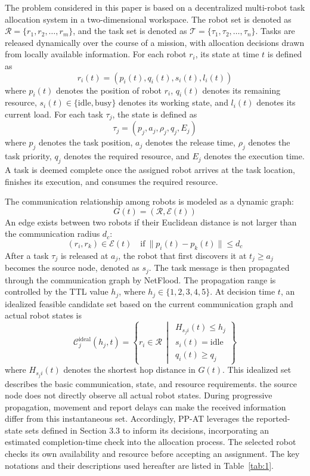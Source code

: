 \documentclass[type=submission,name=IR]{oae}
\begin{document}
The problem considered in this paper is based on a decentralized multi-robot task allocation system in a two-dimensional workspace. The robot set is denoted as $\mathcal{R}=\{r_1,r_2,\ldots,r_m\}$, and the task set is denoted as $\mathcal{T}=\{\tau_1,\tau_2,\ldots,\tau_n\}$. Tasks are released dynamically over the course of a mission, with allocation decisions drawn from locally available information. For each robot $r_i$, its state at time $t$ is defined as
\[
r_i(t)=\left(p_i(t),q_i(t),s_i(t),l_i(t)\right)
\]
where $p_i(t)$ denotes the position of robot $r_i$, $q_i(t)$ denotes its remaining resource, $s_i(t)\in\{\mathrm{idle},\mathrm{busy}\}$ denotes its working state, and $l_i(t)$ denotes its current load. For each task $\tau_j$, the state is defined as
\[
\tau_j=\left(p_j,a_j,\rho_j,q_j,E_j\right)
\]
where $p_j$ denotes the task position, $a_j$ denotes the release time, $\rho_j$ denotes the task priority, $q_j$ denotes the required resource, and $E_j$ denotes the execution time. A task is deemed complete once the assigned robot arrives at the task location, finishes its execution, and consumes the required resource.

The communication relationship among robots is modeled as a dynamic graph:
\[
G(t)=\left(\mathcal{R},\mathcal{E}(t)\right)
\]
An edge exists between two robots if their Euclidean distance is not larger than the communication radius $d_c$:
\[
(r_i,r_k)\in\mathcal{E}(t) \quad \mathrm{if}\ \|p_i(t)-p_k(t)\|\leq d_c
\]
After a task $\tau_j$ is released at $a_j$, the robot that first discovers it at $t_j\geq a_j$ becomes the source node, denoted as $s_j$. The task message is then propagated through the communication graph by NetFlood. The propagation range is controlled by the TTL value $h_j$, where $h_j\in\{1,2,3,4,5\}$. At decision time $t$, an idealized feasible candidate set based on the current communication graph and actual robot states is
\[
\mathcal{C}^{\mathrm{ideal}}_j(h_j,t)=
\left\{
r_i\in\mathcal{R}
\,\middle|\,
\begin{gathered}
H_{s_j i}(t)\leq h_j\\
s_i(t)=\mathrm{idle}\\
q_i(t)\geq q_j
\end{gathered}
\right\}
\]
where $H_{s_j i}(t)$ denotes the shortest hop distance in $G(t)$. This idealized set describes the basic communication, state, and resource requirements. the source node does not directly observe all actual robot states. During progressive propagation, movement and report delays can make the received information differ from this instantaneous set. Accordingly, PP-AT leverages the reported-state sets defined in Section 3.3 to inform its decisions, incorporating an estimated completion-time check into the allocation process. The selected robot checks its own availability and resource before accepting an assignment. The key notations and their descriptions used hereafter are listed in Table~\ref{tab:1}.
\end{document}
